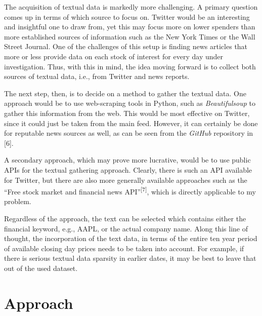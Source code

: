 \documentclass{article}
\begin{document}
The acquisition of textual data is markedly more challenging. A primary question
comes up in terms of which source to focus on. Twitter would be an interesting
and insightful one to draw from, yet this may focus more on lower spenders
than more established sources of information such as the New York Times or the
Wall Street Journal. One of the challenges of this setup is finding news
articles that more or less provide data on each stock of interest for every day
under investigation. Thus, with this in mind, the idea moving forward is to
collect both sources of textual data, i.e., from Twitter and news reports.

The next step, then, is to decide on a method to gather the textual data. One
approach would be to use web-scraping tools in Python, such as
\textit{Beautifulsoup} to gather this information from the web. This would be
most effective on Twitter, since it could just be taken from the main feed.
However, it can certainly be done for reputable news sources as well, as can be
seen from the \textit{GitHub} repository in [6].

A secondary approach, which may prove more lucrative, would be to use public
APIs for the textual gathering approach. Clearly, there is such an API available
for Twitter, but there are also more generally available approaches such as the
``Free stock market and financial news API''\textsuperscript{[7]}, which is
directly applicable to my problem.

Regardless of the approach, the text can be selected which contains either the
financial keyword, e.g., AAPL, or the actual company name. Along this line of
thought, the incorporation of the text data, in terms of the entire ten year
period of available closing day prices needs to be taken into account. For
example, if there is serious textual data sparsity in earlier dates, it may be
best to leave that out of the used dataset.

\section*{Approach}
\end{document}
